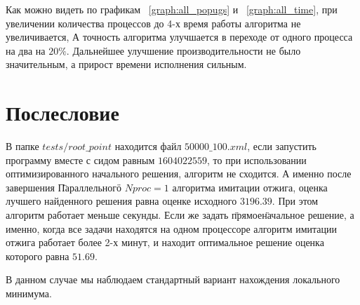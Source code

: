 \documentclass[a4peper, 12pt, titlepage, finall]{extreport}
\begin{document}
            Как можно видеть по графикам ~\ref{graph:all_popugs} и ~\ref{graph:all_time}, при увеличении количества процессов до 4-х время работы алгоритма не увеличивается,
            А точность алгоритма улучшается в переходе от одного процесса на два на $20\%$. Дальнейшее улучшение производительности не было значительным, а прирост времени исполнения сильным.

    \section{Послесловие}
        В папке $tests/root\_point$ находится файл $50000\_100.xml$, если запустить программу вместе с сидом равным $1604022559$, то при использовании оптимизированного начального решения,
        алгоритм не сходится. А именно после завершения \"Параллельного\" $Nproc = 1$ алгоритма имитации отжига, оценка лучшего найденного решения равна оценке исходного $3196.39$.
        При этом алгоритм работает меньше секунды.
        Если же задать \"прямое\" начальное решение, а именно, когда все задачи находятся на одном процессоре алгоритм имитации отжига работает более 2-х минут, и находит оптимальное решение
        оценка которого равна $51.69$.

        В данном случае мы наблюдаем стандартный вариант нахождения локального минимума.
\end{document}
